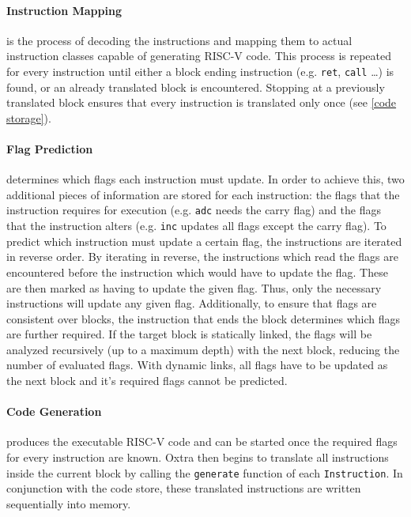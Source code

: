 	\paragraph{Instruction Mapping} is the process of decoding the instructions and mapping them to actual instruction classes capable of generating RISC-V code. This process is repeated for every instruction until either a block ending instruction (e.g. \texttt{ret}, \texttt{call} \dots) is found, or an already translated block is encountered. Stopping at a previously translated block ensures that every instruction is translated only once (see \ref{code storage}). 
	
	\paragraph{Flag Prediction} determines which flags each instruction must update. In order to achieve this, two additional pieces of information are stored for each instruction: the flags that the instruction requires for execution (e.g. \texttt{adc} needs the carry flag) and the flags that the instruction alters (e.g. \texttt{inc} updates all flags except the carry flag). To predict which instruction must update a certain flag, the instructions are iterated in reverse order. By iterating in reverse, the instructions which read the flags are encountered before the instruction which would have to update the flag. These are then marked as having to update the given flag. Thus, only the necessary instructions will update any given flag. Additionally, to ensure that flags are consistent over blocks, the instruction that ends the block determines which flags are further required. If the target block is statically linked, the flags will be analyzed recursively (up to a maximum depth) with the next block, reducing the number of evaluated flags. With dynamic links, all flags have to be updated as the next block and it's required flags cannot be predicted.
	
	\paragraph{Code Generation} produces the executable RISC-V code and can be started once the required flags for every instruction are known. Oxtra then begins to translate all instructions inside the current block by calling the \texttt{generate} function of each \texttt{Instruction}. In conjunction with the code store, these translated instructions are written sequentially into memory. \\
	
